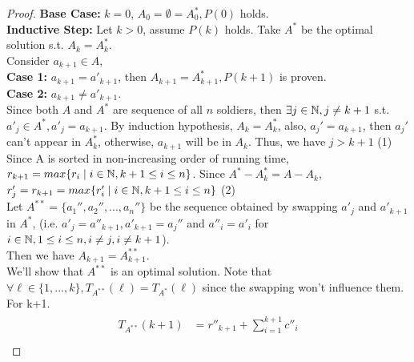 \documentclass[11pt]{article}
\begin{document}
\begin{enumerate}
\begin{enumerate}
\begin{proof}
        \textbf{Base Case:} $k = 0$, $A_0 = \emptyset = A^*_0, P(0)$ holds.\\[2ex]
        \textbf{Inductive Step:} Let $k > 0$, assume $P(k)$ holds. Take $A^*$ be the optimal solution s.t. $A_k = A_k^*$. \\
        Consider $a_{k+1} \in A$, \\
        \textbf{Case 1: } $a_{k+1} = a'_{k+1}$, then $A_{k+1} = A^*_{k+1}, P(k+1)$ is proven. \\
        \textbf{Case 2: } $a_{k+1} \neq a'_{k+1}$.\\
        Since both $A$ and $A^*$ are sequence of all $n$ soldiers, then $\exists j\in \mathbb N, j\neq k+1$ s.t. $a'_j\in A^*, a'_j = a_{k+1}$. By induction hypothesis, $A_k = A^*_k$, also, $a_j' = a_{k+1}$, then $a_j'$ can't appear in $A^*_k$, otherwise, $a_{k+1}$ will be in $A_k$. Thus, we have $j > k+1$    (1)\\[2ex]
        Since A is sorted in non-increasing order of running time, $r_{k+1} = max\{r_i \mid i \in \mathbb N, k+1\leq i \leq n \}$. Since $A^* - A^*_k = A - A_k$, $r'_j = r_{k+1} = max\{r'_i \mid i \in \mathbb N, k+1\leq i \leq n\}$    (2)\\[2ex]
        Let $A^{**} = \{a_1'',a_2'',...,a_n''\}$ be the sequence obtained by swapping $a'_j$ and $a'_{k+1}$ in  $A^*$, (i.e. $a'_j = a''_{k+1}, a'_{k+1} = a_j''$ and $a''_i = a'_i$ for $i\in \mathbb N, 1\leq i \leq n, i\neq j, i \neq k+1$). \\
        Then we have $A_{k+1} = A^{**}_{k+1}$.\\[2ex]
        We'll show that $A^{**}$ is an optimal solution. Note that \\
        $\forall \ell \in \{1,...,k\}, T_{A^{**}}(\ell) = T_{A^*}(\ell)$ since the swapping won't influence them. \\
        For k+1.
        \begin{align*}
            \begin{split}
                 T_{A^{**}}(k+1) &= r''_{k+1} + \sum_{i=1}^{k+1} c''_i \\

\end{split}
\end{align*}
\end{proof}
\end{enumerate}
\end{enumerate}
\end{document}
